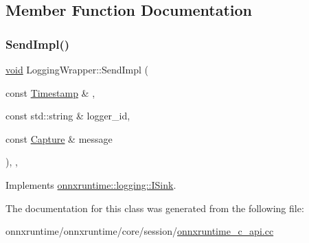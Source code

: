 \subsection{Member Function Documentation}
\mbox{\label{classLoggingWrapper_a3b2d19d153cf366c7db19986e81c7f60}} 
\subsubsection{\texorpdfstring{Send\+Impl()}{SendImpl()}}
{\footnotesize\ttfamily \mbox{\hyperlink{mlasi_8h_a88f941d423cb2a819b70a1358982b1a6}{void}} Logging\+Wrapper\+::\+Send\+Impl (\begin{DoxyParamCaption}\item[{const \mbox{\hyperlink{namespaceonnxruntime_1_1logging_ae7a2a84f622a028e2ad495a74289012d}{Timestamp}} \&}]{,  }\item[{const std\+::string \&}]{logger\+\_\+id,  }\item[{const \mbox{\hyperlink{classonnxruntime_1_1logging_1_1Capture}{Capture}} \&}]{message }\end{DoxyParamCaption})\hspace{0.3cm}{\ttfamily [inline]}, {\ttfamily [override]}, {\ttfamily [virtual]}}



Implements \mbox{\hyperlink{classonnxruntime_1_1logging_1_1ISink}{onnxruntime\+::logging\+::\+I\+Sink}}.



The documentation for this class was generated from the following file\+:\begin{DoxyCompactItemize}
\item 
onnxruntime/onnxruntime/core/session/\mbox{\hyperlink{onnxruntime__c__api_8cc}{onnxruntime\+\_\+c\+\_\+api.\+cc}}\end{DoxyCompactItemize}
